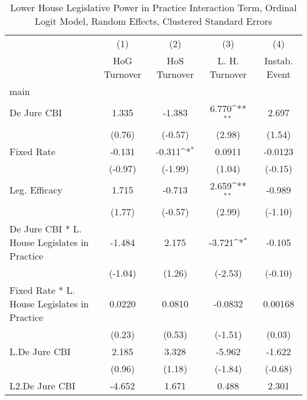 {
\def\sym#1{\ifmmode^{#1}\else\(^{#1}\)\fi}
\begin{longtable}{l*{4}{c}}
\caption{Lower House Legislative Power in Practice Interaction Term, Ordinal Logit Model, Random Effects, Clustered Standard Errors \label{llpintlagordLogDJ}}\\
\hline\hline\endfirsthead\hline\endhead\hline\endfoot\endlastfoot
                &\multicolumn{1}{c}{(1)}&\multicolumn{1}{c}{(2)}&\multicolumn{1}{c}{(3)}&\multicolumn{1}{c}{(4)}\\
                &\multicolumn{1}{c}{HoG Turnover}&\multicolumn{1}{c}{HoS Turnover}&\multicolumn{1}{c}{L. H. Turnover}&\multicolumn{1}{c}{Instab. Event}\\
\hline
main            &                  &                  &                  &                  \\
De Jure CBI     &    1.335         &   -1.383         &    6.770\sym{**} &    2.697         \\
                &   (0.76)         &  (-0.57)         &   (2.98)         &   (1.54)         \\
[1em]
Fixed Rate      &   -0.131         &   -0.311\sym{*}  &   0.0911         &  -0.0123         \\
                &  (-0.97)         &  (-1.99)         &   (1.04)         &  (-0.15)         \\
[1em]
Leg. Efficacy   &    1.715         &   -0.713         &    2.659\sym{**} &   -0.989         \\
                &   (1.77)         &  (-0.57)         &   (2.99)         &  (-1.10)         \\
[1em]
De Jure CBI * L. House Legislates in Practice&   -1.484         &    2.175         &   -3.721\sym{*}  &   -0.105         \\
                &  (-1.04)         &   (1.26)         &  (-2.53)         &  (-0.10)         \\
[1em]
Fixed Rate * L. House Legislates in Practice&   0.0220         &   0.0810         &  -0.0832         &  0.00168         \\
                &   (0.23)         &   (0.53)         &  (-1.51)         &   (0.03)         \\
[1em]
L.De Jure CBI   &    2.185         &    3.328         &   -5.962         &   -1.622         \\
                &   (0.96)         &   (1.18)         &  (-1.84)         &  (-0.68)         \\
[1em]
L2.De Jure CBI  &   -4.652         &    1.671         &    0.488         &    2.301         \\

\end{longtable}}
